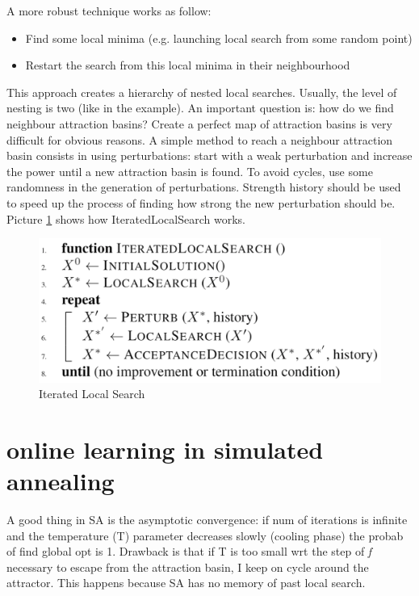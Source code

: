 \documentclass[11pt]{article}
\begin{document}
A more robust technique works as follow:
\begin{itemize}
\item{Find some local minima (e.g. launching local search from some random point)}
\item{Restart the search from this local minima in their neighbourhood}
\end{itemize}
This approach creates a hierarchy of nested local searches. Usually, the level of nesting is two (like in the example). An important question is: how do we find neighbour attraction basins? Create a perfect map of attraction basins is very difficult for obvious reasons. A simple method to reach a neighbour attraction basin consists in using perturbations: start with a weak perturbation and increase the power until a new attraction basin is found. To avoid cycles, use some randomness in the generation of perturbations. Strength history should be used to speed up the process of finding how strong the new perturbation should be.
Picture \ref{fig:ils} shows how IteratedLocalSearch works.

\begin{figure}[H]
\includegraphics[scale=0.25]{ils}
\caption{Iterated Local Search}
\centering
\label{fig:ils}
\end{figure}

\section{online learning in simulated annealing}
A good thing in SA is the asymptotic convergence: if num of iterations is infinite and the temperature (T) parameter decreases slowly (cooling phase) the probab of find global opt is 1. Drawback is that if T is too small wrt the step of \textit{f} necessary to escape from the attraction basin, I keep on cycle around the attractor. This happens because SA has no memory of past local search. 
\end{document}

